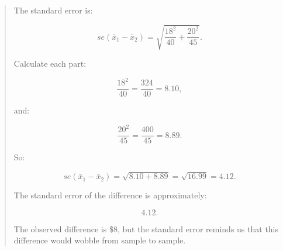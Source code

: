 \documentclass[
  letterpaper,
  DIV=11,
  numbers=noendperiod]{scrreprt}
\begin{document}
\begin{tcolorbox}
\begin{quote}
The standard error is:

\[
se(\bar{x}_1 - \bar{x}_2)
=
\sqrt{
\frac{18^2}{40}
+
\frac{20^2}{45}
}.
\]

Calculate each part:

\[
\frac{18^2}{40}
=
\frac{324}{40}
=
8.10,
\]

and:

\[
\frac{20^2}{45}
=
\frac{400}{45}
=
8.89.
\]

So:

\[
se(\bar{x}_1 - \bar{x}_2)
=
\sqrt{8.10+8.89}
=
\sqrt{16.99}
=
4.12.
\]

The standard error of the difference is approximately:

\[
4.12.
\]

The observed difference is \$8, but the standard error reminds us that
this difference would wobble from sample to sample.
\end{quote}

\end{tcolorbox}
\end{document}

